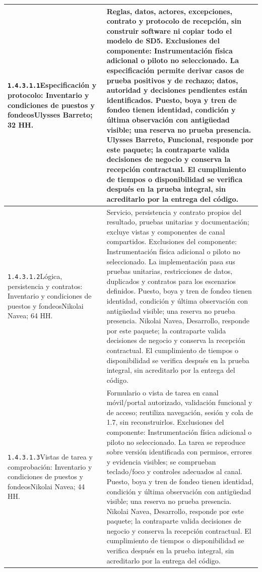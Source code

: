 \begin{longtable}{L{52mm}L{91mm}}
\texttt{1.\allowbreak{}4.\allowbreak{}3.\allowbreak{}1.\allowbreak{}1}\newline Especificación y protocolo: Inventario y condiciones de puestos y fondeos\newline Ulysses Barreto; 32 HH. & Reglas, datos, actores, excepciones, contrato y protocolo de recepción, sin construir software ni copiar todo el modelo de SD5. Exclusiones del componente: Instrumentación física adicional o piloto no seleccionado. La especificación permite derivar casos de prueba positivos y de rechazo; datos, autoridad y decisiones pendientes están identificados. Puesto, boya y tren de fondeo tienen identidad, condición y última observación con antigüedad visible; una reserva no prueba presencia. Ulysses Barreto, Funcional, responde por este paquete; la contraparte valida decisiones de negocio y conserva la recepción contractual. El cumplimiento de tiempos o disponibilidad se verifica después en la prueba integral, sin acreditarlo por la entrega del código.\\\hline
\texttt{1.\allowbreak{}4.\allowbreak{}3.\allowbreak{}1.\allowbreak{}2}\newline Lógica, persistencia y contratos: Inventario y condiciones de puestos y fondeos\newline Nikolai Navea; 64 HH. & Servicio, persistencia y contrato propios del resultado, pruebas unitarias y documentación; excluye vistas y componentes de canal compartidos. Exclusiones del componente: Instrumentación física adicional o piloto no seleccionado. La implementación pasa sus pruebas unitarias, restricciones de datos, duplicados y contratos para los escenarios definidos. Puesto, boya y tren de fondeo tienen identidad, condición y última observación con antigüedad visible; una reserva no prueba presencia. Nikolai Navea, Desarrollo, responde por este paquete; la contraparte valida decisiones de negocio y conserva la recepción contractual. El cumplimiento de tiempos o disponibilidad se verifica después en la prueba integral, sin acreditarlo por la entrega del código.\\\hline
\texttt{1.\allowbreak{}4.\allowbreak{}3.\allowbreak{}1.\allowbreak{}3}\newline Vistas de tarea y comprobación: Inventario y condiciones de puestos y fondeos\newline Nikolai Navea; 44 HH. & Formulario o vista de tarea en canal móvil/portal autorizado, validación funcional y de acceso; reutiliza navegación, sesión y cola de 1.7, sin reconstruirlos. Exclusiones del componente: Instrumentación física adicional o piloto no seleccionado. La tarea se reproduce sobre versión identificada con permisos, errores y evidencia visibles; se comprueban teclado/foco y controles adecuados al canal. Puesto, boya y tren de fondeo tienen identidad, condición y última observación con antigüedad visible; una reserva no prueba presencia. Nikolai Navea, Desarrollo, responde por este paquete; la contraparte valida decisiones de negocio y conserva la recepción contractual. El cumplimiento de tiempos o disponibilidad se verifica después en la prueba integral, sin acreditarlo por la entrega del código.\\\hline

\end{longtable}
